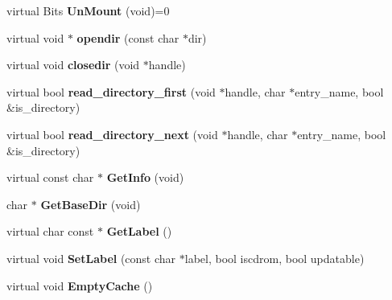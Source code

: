 \begin{DoxyCompactItemize}
\item 
\hypertarget{classDOS__Drive_aef7bc7c1cbf09e4fe88ee8bc7435db07}{virtual Bits {\bfseries Un\-Mount} (void)=0}\label{classDOS__Drive_aef7bc7c1cbf09e4fe88ee8bc7435db07}

\item 
\hypertarget{classDOS__Drive_ae382ad86607e9926893e78af7231ec61}{virtual void $\ast$ {\bfseries opendir} (const char $\ast$dir)}\label{classDOS__Drive_ae382ad86607e9926893e78af7231ec61}

\item 
\hypertarget{classDOS__Drive_af52e4214f17f23c70751df925582ba12}{virtual void {\bfseries closedir} (void $\ast$handle)}\label{classDOS__Drive_af52e4214f17f23c70751df925582ba12}

\item 
\hypertarget{classDOS__Drive_ac595d4546118da9910b2f736b7af1c41}{virtual bool {\bfseries read\-\_\-directory\-\_\-first} (void $\ast$handle, char $\ast$entry\-\_\-name, bool \&is\-\_\-directory)}\label{classDOS__Drive_ac595d4546118da9910b2f736b7af1c41}

\item 
\hypertarget{classDOS__Drive_aaf4039f2a7830fab1b0c8603542f9f31}{virtual bool {\bfseries read\-\_\-directory\-\_\-next} (void $\ast$handle, char $\ast$entry\-\_\-name, bool \&is\-\_\-directory)}\label{classDOS__Drive_aaf4039f2a7830fab1b0c8603542f9f31}

\item 
\hypertarget{classDOS__Drive_a64bf9af6eca73f8071c109a2d4c25d02}{virtual const char $\ast$ {\bfseries Get\-Info} (void)}\label{classDOS__Drive_a64bf9af6eca73f8071c109a2d4c25d02}

\item 
\hypertarget{classDOS__Drive_abbaeec032c93d0f14760b12f39386eec}{char $\ast$ {\bfseries Get\-Base\-Dir} (void)}\label{classDOS__Drive_abbaeec032c93d0f14760b12f39386eec}

\item 
\hypertarget{classDOS__Drive_a8e239d9aa134597f38505b39b8ca8016}{virtual char const $\ast$ {\bfseries Get\-Label} ()}\label{classDOS__Drive_a8e239d9aa134597f38505b39b8ca8016}

\item 
\hypertarget{classDOS__Drive_a20d9aa48e274a59070f10d949802a4b2}{virtual void {\bfseries Set\-Label} (const char $\ast$label, bool iscdrom, bool updatable)}\label{classDOS__Drive_a20d9aa48e274a59070f10d949802a4b2}

\item 
\hypertarget{classDOS__Drive_a2ec8efe8d1b50b3c8a7b3bde52000e0e}{virtual void {\bfseries Empty\-Cache} ()}\label{classDOS__Drive_a2ec8efe8d1b50b3c8a7b3bde52000e0e}


\end{DoxyCompactItemize}

